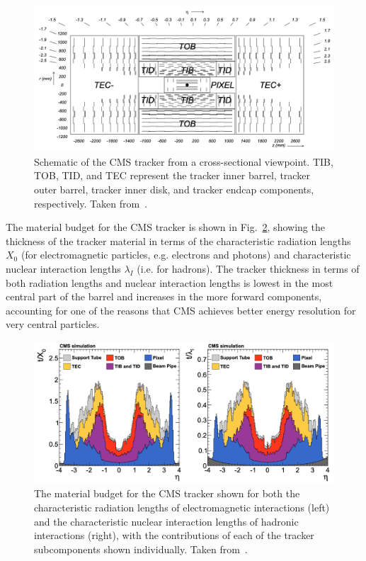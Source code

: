 \begin{figure} [htbp!]
    \centering
    \includegraphics[width=0.8\linewidth]{figures/cms/cms_tracker_schematic.png}
    \caption{Schematic of the CMS tracker from a cross-sectional viewpoint. TIB, TOB, TID, and TEC represent the tracker inner barrel, tracker outer barrel, tracker inner disk, and tracker endcap components, respectively. Taken from~\cite{Chatrchyan:2008aa}.}
    \label{fig:cms_tracker_schematic}
\end{figure}

The material budget for the CMS tracker is shown in Fig.~\ref{fig:cms_tracker_budget}, showing the thickness of the tracker material in terms of the characteristic radiation lengths $X_0$ (for electromagnetic particles, e.g. electrons and photons) and characteristic nuclear interaction lengths $\lambda_I$ (i.e. for hadrons).
The tracker thickness in terms of both radiation lengths and nuclear interaction lengths is lowest in the most central part of the barrel and increases in the more forward components, accounting for one of the reasons that CMS achieves better energy resolution for very central particles.

\begin{figure} [htbp!]
    \centering
    \includegraphics[width=\linewidth]{figures/cms/cms_tracker_budget.png}
    \caption{The material budget for the CMS tracker shown for both the characteristic radiation lengths of electromagnetic interactions (left) and the characteristic nuclear interaction lengths of hadronic interactions (right), with the contributions of each of the tracker subcomponents shown individually. Taken from~\cite{Chatrchyan:1704291}.}
    \label{fig:cms_tracker_budget}
\end{figure}

